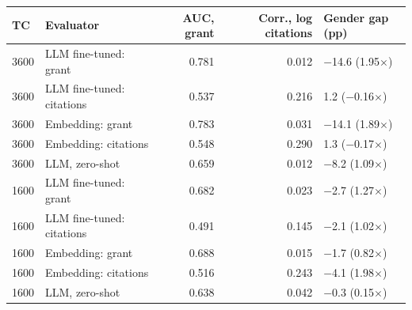 \begin{tabular}{llrrl}
\toprule
TC & Evaluator & AUC, grant & Corr., log citations & Gender gap (pp) \\
\midrule
3600 & LLM fine-tuned: grant & 0.781 & 0.012 & $-$14.6 (1.95$\times$) \\
3600 & LLM fine-tuned: citations & 0.537 & 0.216 & 1.2 ($-$0.16$\times$) \\
3600 & Embedding: grant & 0.783 & 0.031 & $-$14.1 (1.89$\times$) \\
3600 & Embedding: citations & 0.548 & 0.290 & 1.3 ($-$0.17$\times$) \\
3600 & LLM, zero-shot & 0.659 & 0.012 & $-$8.2 (1.09$\times$) \\
1600 & LLM fine-tuned: grant & 0.682 & 0.023 & $-$2.7 (1.27$\times$) \\
1600 & LLM fine-tuned: citations & 0.491 & 0.145 & $-$2.1 (1.02$\times$) \\
1600 & Embedding: grant & 0.688 & 0.015 & $-$1.7 (0.82$\times$) \\
1600 & Embedding: citations & 0.516 & 0.243 & $-$4.1 (1.98$\times$) \\
1600 & LLM, zero-shot & 0.638 & 0.042 & $-$0.3 (0.15$\times$) \\
\bottomrule
\end{tabular}
